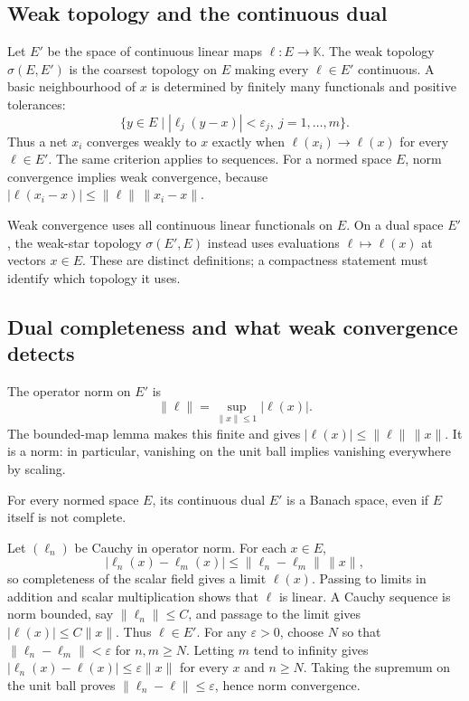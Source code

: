 \subsection{Weak topology and the continuous dual}
Let $E'$ be the space of continuous linear maps $\ell:E\to\mathbb{K}$.
The weak topology $\sigma(E,E')$ is the coarsest topology on $E$
making every $\ell\in E'$ continuous. A basic neighbourhood of $x$
is determined by finitely many functionals and positive tolerances:
\[
\{y\in E\mid |\ell_j(y-x)|<\varepsilon_j,
  \ j=1,\ldots,m\}.
\]
Thus a net $x_i$ converges weakly to $x$ exactly when
$\ell(x_i)\to\ell(x)$ for every $\ell\in E'$. The same criterion
applies to sequences. For a normed space $E$, norm convergence implies weak convergence,
because $|\ell(x_i-x)|\leqslant\|\ell\|\,\|x_i-x\|$.

Weak convergence uses all continuous linear functionals on $E$.
On a dual space $E'$, the weak-star topology $\sigma(E',E)$ instead
uses evaluations $\ell\mapsto\ell(x)$ at vectors $x\in E$.
These are distinct definitions; a compactness statement must identify
which topology it uses.

\subsection{Dual completeness and what weak convergence detects}
The operator norm on $E'$ is
\[
\|\ell\|=\sup_{\|x\|\leqslant1}|\ell(x)|.
\]
The bounded-map lemma makes this finite and gives
$|\ell(x)|\leqslant\|\ell\|\,\|x\|$. It is a norm: in particular,
vanishing on the unit ball implies vanishing everywhere by scaling.

\begin{theorem}
For every normed space $E$, its continuous dual $E'$ is a Banach space,
even if $E$ itself is not complete.
\end{theorem}
\Proof
Let $(\ell_n)$ be Cauchy in operator norm. For each $x\in E$,
\[
|\ell_n(x)-\ell_m(x)|\leqslant\|\ell_n-\ell_m\|\,\|x\|,
\]
so completeness of the scalar field gives a limit $\ell(x)$.
Passing to limits in addition and scalar multiplication shows that
$\ell$ is linear. A Cauchy sequence is norm bounded, say
$\|\ell_n\|\leqslant C$, and passage to the limit gives
$|\ell(x)|\leqslant C\|x\|$. Thus $\ell\in E'$.
For any $\varepsilon>0$, choose $N$ so that
$\|\ell_n-\ell_m\|<\varepsilon$ for $n,m\geqslant N$.
Letting $m$ tend to infinity gives
$|\ell_n(x)-\ell(x)|\leqslant\varepsilon\|x\|$ for every $x$ and
$n\geqslant N$. Taking the supremum on the unit ball proves
$\|\ell_n-\ell\|\leqslant\varepsilon$, hence norm convergence.
\Done

